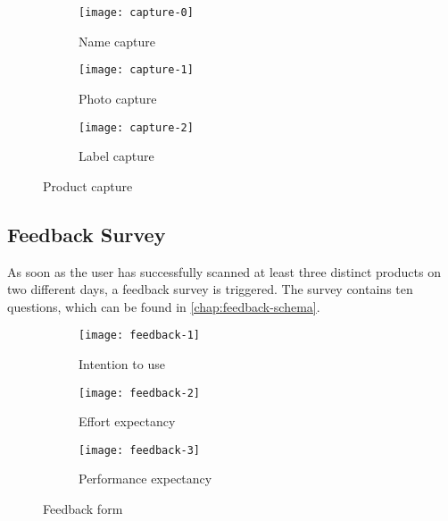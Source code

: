 \begin{figure}[H]
     \centering
     \begin{subfigure}[b]{0.28\textwidth}
         \centering
         \texttt{[image: capture-0]}
         \caption{Name capture}
         \label{fig:capture-0}
     \end{subfigure}
          \hfill
     \begin{subfigure}[b]{0.28\textwidth}
         \centering
         \texttt{[image: capture-1]}
         \caption{Photo capture}
         \label{fig:capture-1}
     \end{subfigure}
          \hfill
     \begin{subfigure}[b]{0.28\textwidth}
         \centering
         \texttt{[image: capture-2]}
         \caption{Label capture}
         \label{fig:capture-2}
     \end{subfigure}
        \caption{Product capture}
        \label{fig:capture}
\end{figure}

\subsection{Feedback Survey}
\label{sub:feedback-criteria}

As soon as the user has successfully scanned at least three distinct products on two different days, a feedback survey is triggered. The survey contains ten questions, which can be found in \cref{chap:feedback-schema}.

\begin{figure}[H]
     \centering
     \begin{subfigure}[b]{0.32\textwidth}
         \centering
         \texttt{[image: feedback-1]}
         \caption{Intention to use}
         \label{fig:feedback-1}
     \end{subfigure}
          \hfill
     \begin{subfigure}[b]{0.32\textwidth}
         \centering
         \texttt{[image: feedback-2]}
         \caption{Effort expectancy}
         \label{fig:feedback-2}
    \end{subfigure}
          \hfill
     \begin{subfigure}[b]{0.32\textwidth}
         \centering
         \texttt{[image: feedback-3]}
         \caption{Performance expectancy}
         \label{fig:feedback-3}
     \end{subfigure}
        \caption{Feedback form}
        \label{fig:feedback}

\end{figure}


